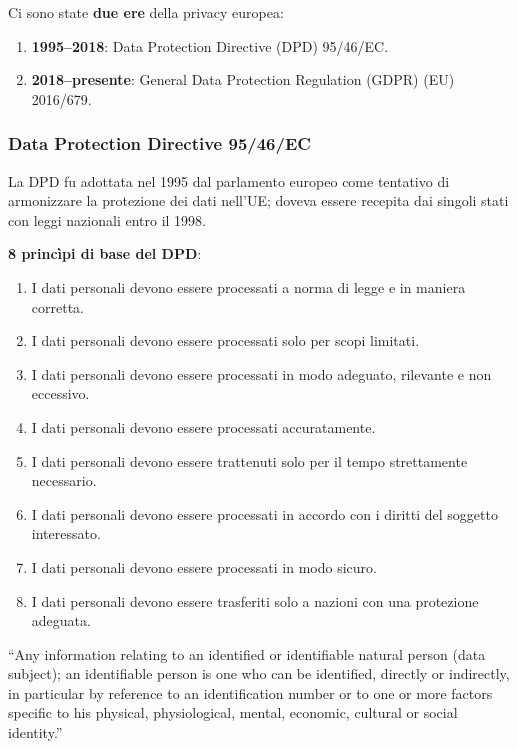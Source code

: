 \documentclass[a4paper,11pt]{article}
\begin{document}
Ci sono state \textbf{due ere} della privacy europea:
\begin{enumerate}
  \item \textbf{1995--2018}: Data Protection Directive (DPD) 95/46/EC.
  \item \textbf{2018--presente}: General Data Protection Regulation (GDPR) (EU) 2016/679.
\end{enumerate}

\subsubsection{Data Protection Directive 95/46/EC}

La DPD fu adottata nel 1995 dal parlamento europeo come tentativo di armonizzare la protezione dei dati nell'UE; doveva essere recepita dai singoli stati con leggi nazionali entro il 1998.

\textbf{8 princìpi di base del DPD}:
\begin{enumerate}
  \item I dati personali devono essere processati a norma di legge e in maniera corretta.
  \item I dati personali devono essere processati solo per scopi limitati.
  \item I dati personali devono essere processati in modo adeguato, rilevante e non eccessivo.
  \item I dati personali devono essere processati accuratamente.
  \item I dati personali devono essere trattenuti solo per il tempo strettamente necessario.
  \item I dati personali devono essere processati in accordo con i diritti del soggetto interessato.
  \item I dati personali devono essere processati in modo sicuro.
  \item I dati personali devono essere trasferiti solo a nazioni con una protezione adeguata.
\end{enumerate}

\begin{definizione}
``Any information relating to an identified or identifiable natural person (data subject); an identifiable person is one who can be identified, directly or indirectly, in particular by reference to an identification number or to one or more factors specific to his physical, physiological, mental, economic, cultural or social identity.''
\end{definizione}
\end{document}
